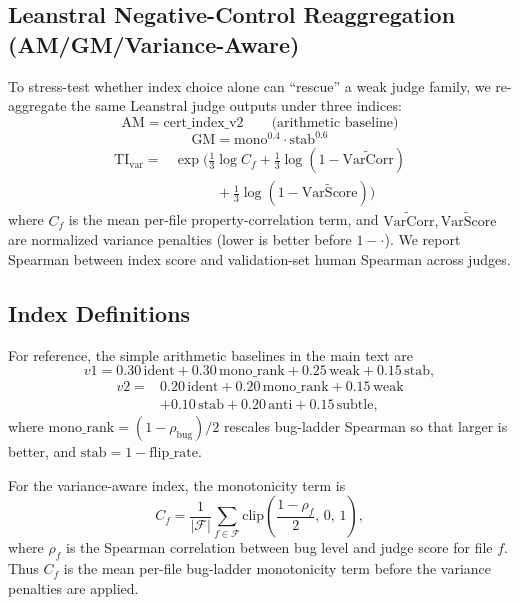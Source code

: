 \subsection{Leanstral Negative-Control Reaggregation (AM/GM/Variance-Aware)}
To stress-test whether index choice alone can ``rescue'' a weak judge family, we re-aggregate the same Leanstral judge outputs under three indices:
\[
  \mathrm{AM}=\text{cert\_index\_v2}
  \qquad \text{(arithmetic baseline)}
\]
\[
  \mathrm{GM}=\mathrm{mono}^{0.4}\cdot \mathrm{stab}^{0.6}
\]
\[
  \begin{aligned}
    \mathrm{TI}_{\mathrm{var}}
    ={} & \exp\!\Big(
    \tfrac{1}{3}\log C_f
    + \tfrac{1}{3}\log(1-\widetilde{\mathrm{VarCorr}}) \\
        & \qquad\quad
    + \tfrac{1}{3}\log(1-\widetilde{\mathrm{VarScore}})
    \Big)
  \end{aligned}
\]
where \(C_f\) is the mean per-file property-correlation term, and \(\widetilde{\mathrm{VarCorr}},\widetilde{\mathrm{VarScore}}\) are normalized variance penalties (lower is better before \(1-\cdot\)).
We report Spearman between index score and validation-set human Spearman across judges.

\subsection{Index Definitions}\label{app:index-definitions}
For reference, the simple arithmetic baselines in the main text are
\[
  v1 = 0.30\,\text{ident} + 0.30\,\text{mono\_rank} + 0.25\,\text{weak} + 0.15\,\text{stab},
\]
\[
  \begin{aligned}
    v2 ={} & 0.20\,\text{ident} + 0.20\,\text{mono\_rank} + 0.15\,\text{weak} \\
           & + 0.10\,\text{stab} + 0.20\,\text{anti} + 0.15\,\text{subtle},
  \end{aligned}
\]
where \(\text{mono\_rank}=(1-\rho_{\text{bug}})/2\) rescales bug-ladder Spearman so that larger is better, and \(\text{stab}=1-\text{flip\_rate}\).

For the variance-aware index, the monotonicity term is
\[
  C_f = \frac{1}{|\mathcal{F}|}\sum_{f \in \mathcal{F}} \mathrm{clip}\!\left(\frac{1-\rho_f}{2},\,0,\,1\right),
\]
where \(\rho_f\) is the Spearman correlation between bug level and judge score for file \(f\).
Thus \(C_f\) is the mean per-file bug-ladder monotonicity term before the variance penalties are applied.

